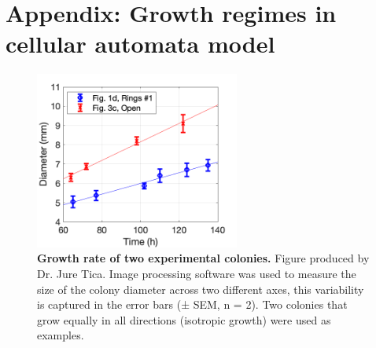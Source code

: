 \chapter{Appendix: Growth regimes in cellular automata model}\label{appendix_growth_rates}
\begin{figure}[H] %
    \centering
    \begin{adjustbox}{center}
        \includegraphics[width=0.6\textwidth]{chapters/Appendix/fig_growth_curves_e20210611} %
    \end{adjustbox}
    \caption{\textbf{Growth rate of two experimental colonies.} Figure produced by Dr. Jure Tica. Image processing software was used to measure the size of the colony diameter across two different axes, this variability is captured in the error bars (± SEM, n = 2). Two colonies that grow equally in all directions (isotropic growth) were used as examples.}
    \label{fig:fig_growth_curves_e20210611}
\end{figure}

